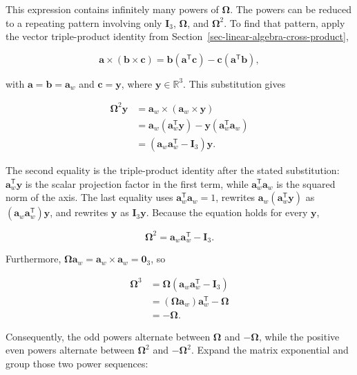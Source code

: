\documentclass[
  australian,
  12pt,
  letterpaper,
  DIV=11,
  numbers=noendperiod,
  twoside]{scrreprt}
\begin{document}
This expression contains infinitely many powers of
\(\boldsymbol\Omega\). The powers can be reduced to a repeating pattern
involving only \(\mathbf I_3\), \(\boldsymbol\Omega\), and
\(\boldsymbol\Omega^2\). To find that pattern, apply the vector
triple-product identity from
Section~\ref{sec-linear-algebra-cross-product},

\[
\mathbf a\times(\mathbf b\times\mathbf c)
=
\mathbf b(\mathbf a^\mathsf T\mathbf c)
-
\mathbf c(\mathbf a^\mathsf T\mathbf b),
\]

with \(\mathbf a=\mathbf b=\mathbf a_w\) and \(\mathbf c=\mathbf y\),
where \(\mathbf y\in\mathbb R^3\). This substitution gives

\[
\begin{aligned}
\boldsymbol\Omega^2\mathbf y
&=
\mathbf a_w\times(\mathbf a_w\times\mathbf y)\\
&=
\mathbf a_w(\mathbf a_w^\mathsf T\mathbf y)
-
\mathbf y(\mathbf a_w^\mathsf T\mathbf a_w)\\
&=
\left(
\mathbf a_w\mathbf a_w^\mathsf T
-
\mathbf I_3
\right)\mathbf y.
\end{aligned}
\]

The second equality is the triple-product identity after the stated
substitution: \(\mathbf a_w^\mathsf T\mathbf y\) is the scalar
projection factor in the first term, while
\(\mathbf a_w^\mathsf T\mathbf a_w\) is the squared norm of the axis.
The last equality uses \(\mathbf a_w^\mathsf T\mathbf a_w=1\), rewrites
\(\mathbf a_w(\mathbf a_w^\mathsf T\mathbf y)\) as
\((\mathbf a_w\mathbf a_w^\mathsf T)\mathbf y\), and rewrites
\(\mathbf y\) as \(\mathbf I_3\mathbf y\). Because the equation holds
for every \(\mathbf y\),

\[
\boxed{
\boldsymbol\Omega^2
=
\mathbf a_w\mathbf a_w^\mathsf T
-
\mathbf I_3
}.
\]

Furthermore,
\(\boldsymbol\Omega\mathbf a_w=\mathbf a_w\times\mathbf a_w=\mathbf 0_3\),
so

\[
\begin{aligned}
\boldsymbol\Omega^3
&=
\boldsymbol\Omega
\left(
\mathbf a_w\mathbf a_w^\mathsf T-
\mathbf I_3
\right)\\
&=
(\boldsymbol\Omega\mathbf a_w)\mathbf a_w^\mathsf T
-
\boldsymbol\Omega\\
&=
-\boldsymbol\Omega.
\end{aligned}
\]

Consequently, the odd powers alternate between \(\boldsymbol\Omega\) and
\(-\boldsymbol\Omega\), while the positive even powers alternate between
\(\boldsymbol\Omega^2\) and \(-\boldsymbol\Omega^2\). Expand the matrix
exponential and group those two power sequences:
\end{document}
